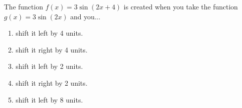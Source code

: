\bigskip

\item The function $f(x) = 3 \sin( 2x + 4)$ is created when you take the function $g(x) = 3 \sin ( 2 x)$ and you...


\begin{enumerate}
\item shift it left by 4 units.
\item shift it right by 4 units.
\item shift it left by 2 units.
\item shift it right by 2 units.
\item shift it left by 8 units.
\end{enumerate}

